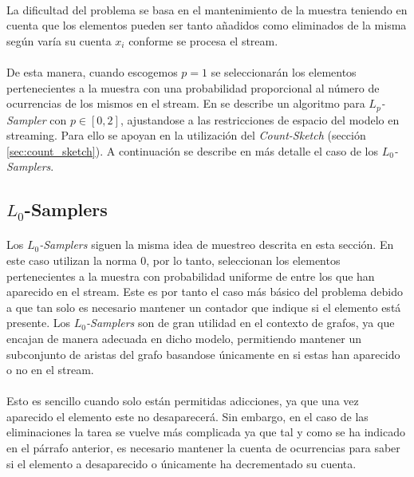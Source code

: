 \documentclass{subfiles}
\begin{document}
      \paragraph{}
      La dificultad del problema se basa en el mantenimiento de la muestra teniendo en cuenta que los elementos pueden ser tanto añadidos como eliminados de la misma según varía su cuenta $x_i$ conforme se procesa el stream.

      \paragraph{}
      De esta manera, cuando escogemos $p =1$ se seleccionarán los elementos pertenecientes a la muestra con una probabilidad proporcional al número de ocurrencias de los mismos en el stream. En \cite{jowhari2011tight} se describe un algoritmo para \emph{$L_p$-Sampler} con $p \in [0,2]$, ajustandose a las restricciones de espacio del modelo en streaming. Para ello se apoyan en la utilización del \emph{Count-Sketch} (sección \ref{sec:count_sketch}). A continuación se describe en más detalle el caso de los \emph{$L_0$-Samplers}.

      \subsection{$L_0$-Samplers}
      \label{sec:l0_samplers}

      \paragraph{}
      Los \emph{$L_0$-Samplers} siguen la misma idea de muestreo descrita en esta sección. En este caso utilizan la norma $0$, por lo tanto, seleccionan los elementos pertenecientes a la muestra con probabilidad uniforme de entre los que han aparecido en el stream. Este es por tanto el caso más básico del problema debido a que tan solo es necesario mantener un contador que indique si el elemento está presente. Los \emph{$L_0$-Samplers} son de gran utilidad en el contexto de grafos, ya que encajan de manera adecuada en dicho modelo, permitiendo mantener un subconjunto de aristas del grafo basandose únicamente en si estas han aparecido o no en el stream.

      \paragraph{}
      Esto es sencillo cuando solo están permitidas adicciones, ya que una vez aparecido el elemento este no desaparecerá. Sin embargo, en el caso de las eliminaciones la tarea se vuelve más complicada ya que tal y como se ha indicado en el párrafo anterior, es necesario mantener la cuenta de ocurrencias para saber si el elemento a desaparecido o únicamente ha decrementado su cuenta.
\end{document}
